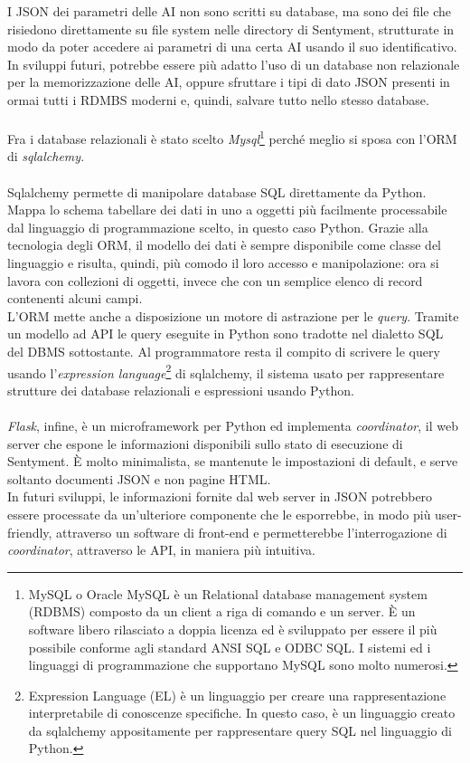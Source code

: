 \documentclass[a4paper,12pt]{report}
\begin{document}
I JSON dei parametri delle AI non sono scritti su database, ma sono dei file che risiedono direttamente su file system nelle directory di Sentyment, strutturate in modo da poter accedere ai parametri di una certa AI usando il suo identificativo. In sviluppi futuri, potrebbe essere più adatto l'uso di un database non relazionale per la memorizzazione delle AI, oppure sfruttare i tipi di dato JSON presenti in ormai tutti i RDMBS moderni e, quindi, salvare tutto nello stesso database.\\~\\
Fra i database relazionali è stato scelto \textit{Mysql}\footnote{MySQL o Oracle MySQL è un Relational database management system (RDBMS) composto da un client a riga di comando e un server. È un software libero rilasciato a doppia licenza ed è sviluppato per essere il più possibile conforme agli standard ANSI SQL e ODBC SQL. I sistemi ed i linguaggi di programmazione che supportano MySQL sono molto numerosi.} perché meglio si sposa con l'ORM di \textit{sqlalchemy}.\\~\\
Sqlalchemy permette di manipolare database SQL direttamente da Python. Mappa lo schema tabellare dei dati in uno a oggetti più facilmente processabile dal linguaggio di programmazione scelto, in questo caso Python. Grazie alla tecnologia degli ORM, il modello dei dati è sempre disponibile come classe del linguaggio e risulta, quindi, più comodo il loro accesso e manipolazione: ora si lavora con collezioni di oggetti, invece che con un semplice elenco di record contenenti alcuni campi.\\
L'ORM mette anche a disposizione un motore di astrazione per le \textit{query}. Tramite un modello ad API le query eseguite in Python sono tradotte nel dialetto SQL del DBMS sottostante. Al programmatore resta il compito di scrivere le query usando l'\textit{expression language}\footnote{Expression Language (EL) è un linguaggio per creare una rappresentazione interpretabile di conoscenze specifiche. In questo caso, è un linguaggio creato da sqlalchemy appositamente per rappresentare query SQL nel linguaggio di Python.} di sqlalchemy, il sistema usato per rappresentare strutture dei database relazionali e espressioni usando Python.\\~\\
\textit{Flask}, infine, è un microframework per Python ed implementa \textit{coordinator}, il web server che espone le informazioni disponibili sullo stato di esecuzione di Sentyment. È molto minimalista, se mantenute le impostazioni di default, e serve soltanto documenti JSON e non pagine HTML.\\
In futuri sviluppi, le informazioni fornite dal web server in JSON potrebbero essere processate da un'ulteriore componente che le esporrebbe, in modo più user-friendly, attraverso un software di front-end e permetterebbe l'interrogazione di \textit{coordinator}, attraverso le API, in maniera più intuitiva.
\end{document}
